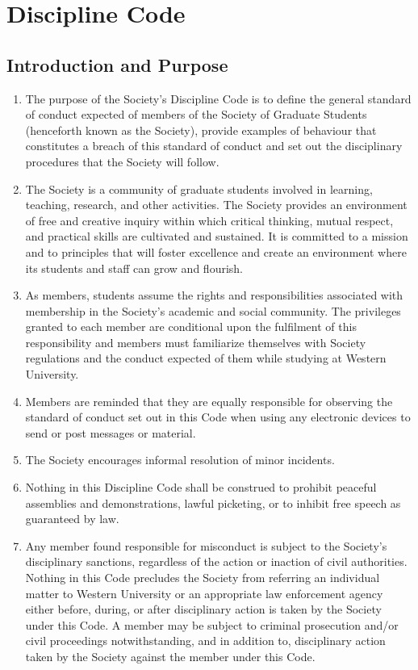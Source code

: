 \section{Discipline Code}

\subsection{Introduction and Purpose}
\begin{enumerate} [align=left]
\item  The purpose of the Society's Discipline Code is to define the general standard of conduct expected of members of the Society of Graduate Students (henceforth known as the Society), provide examples of behaviour that constitutes a breach of this standard of conduct and set out the disciplinary procedures that the Society will follow.
\item The Society is a community of graduate students involved in learning, teaching, research, and other activities. The Society provides an environment of free and creative inquiry within which critical thinking, mutual respect, and practical skills are cultivated and sustained. It is committed to a mission and to principles that will foster excellence and create an environment where its students and staff can grow and flourish.
\item As members, students assume the rights and responsibilities associated with membership in the Society's academic and social community. The privileges granted to each member are conditional upon the fulfilment of this responsibility and members must familiarize themselves with Society regulations and the conduct expected of them while studying at Western University.
\item Members are reminded that they are equally responsible for observing the standard of conduct set out in this Code when using any electronic devices to send or post messages or material.
\item The Society encourages informal resolution of minor incidents.
\item Nothing in this Discipline Code shall be construed to prohibit peaceful assemblies and demonstrations, lawful picketing, or to inhibit free speech as guaranteed by law.
\item Any member found responsible for misconduct is subject to the Society's disciplinary sanctions, regardless of the action or inaction of civil authorities. Nothing in this Code precludes the Society from referring an individual matter to Western University or an appropriate law enforcement agency either before, during, or after disciplinary action is taken by the Society under this Code. A member may be subject to criminal prosecution and/or civil proceedings notwithstanding, and in addition to, disciplinary action taken by the Society against the member under this Code.
\end{enumerate}

